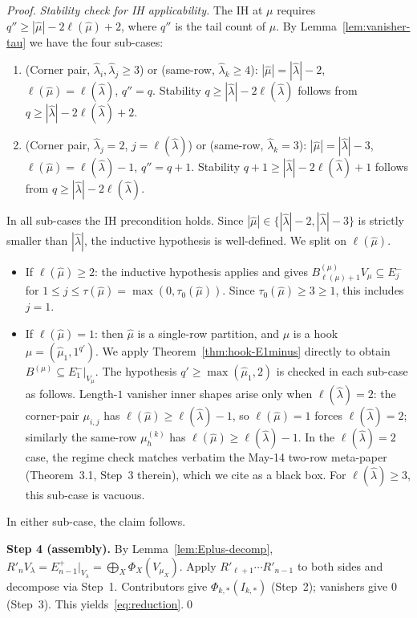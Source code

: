 \documentclass[11pt]{article}
\theoremstyle{definition}
\newcommand{\Vlam}{V_\lambda}
\newcommand{\hatl}{\widehat\lambda}
\newcommand{\hatm}{\widehat\mu}
\newcommand{\Rp}{{R'}}
\newcommand{\elh}{\ell(\hatl)}
\begin{document}
\begin{proof}
\smallskip\emph{Stability check for IH applicability.}  The IH at
$\mu$ requires $q'' \ge |\hatm| - 2\ell(\hatm) + 2$, where $q''$ is the
tail count of $\mu$.  By Lemma~\ref{lem:vanisher-tau} we have the four
sub-cases:
\begin{enumerate}[label=(\arabic*),topsep=0.2em,itemsep=0.1em]
\item (Corner pair, $\hatl_i, \hatl_j \ge 3$) or (same-row, $\hatl_k
   \ge 4$): $|\hatm| = |\hatl| - 2$, $\ell(\hatm) = \elh$, $q'' = q$.
   Stability $q \ge |\hatl| - 2\elh$ follows from $q \ge |\hatl| -
   2\elh + 2$.
\item (Corner pair, $\hatl_j = 2$, $j = \elh$) or (same-row,
   $\hatl_k = 3$): $|\hatm| = |\hatl| - 3$, $\ell(\hatm) = \elh - 1$,
   $q'' = q + 1$.  Stability $q + 1 \ge |\hatl| - 2\elh + 1$ follows
   from $q \ge |\hatl| - 2\elh$.
\end{enumerate}
In all sub-cases the IH precondition holds.  Since $|\hatm| \in
\{|\hatl| - 2, |\hatl| - 3\}$ is strictly smaller than $|\hatl|$, the
inductive hypothesis is well-defined.  We split on $\ell(\hatm)$.
\begin{itemize}[topsep=0.2em,itemsep=0.1em]
\item If $\ell(\hatm) \ge 2$: the inductive hypothesis applies and
   gives $B^{(\mu)}_{\ell(\mu)+1} V_\mu \subseteq E_j^-$ for
   $1 \le j \le \tau(\hatm) = \max(0, \tau_0(\hatm))$.  Since
   $\tau_0(\hatm) \ge 3 \ge 1$, this includes $j = 1$.
\item If $\ell(\hatm) = 1$: then $\hatm$ is a single-row partition,
   and $\mu$ is a hook $\mu = (\hatm_1, 1^{q'})$.  We apply
   Theorem~\ref{thm:hook-E1minus} directly to obtain $B^{(\mu)}
   \subseteq E_1^-|_{V_\mu}$.  The hypothesis $q' \ge \max(\hatm_1, 2)$
   is checked in each sub-case as follows.  Length-$1$ vanisher inner
   shapes arise only when $\elh = 2$: the corner-pair $\mu_{i,j}$ has
   $\ell(\hatm) \ge \elh - 1$, so $\ell(\hatm) = 1$ forces $\elh = 2$;
   similarly the same-row $\mu_h^{(k)}$ has $\ell(\hatm) \ge \elh - 1$.
   In the $\elh = 2$ case, the regime check matches verbatim the
   May-14 two-row meta-paper (Theorem~3.1, Step~3 therein), which we
   cite as a black box.  For $\elh \ge 3$, this sub-case is vacuous.
\end{itemize}

In either sub-case, the claim follows.\smallskip

\medskip\textbf{Step 4 (assembly).}  By Lemma~\ref{lem:Eplus-decomp},
$\Rp_n \Vlam = E_{n-1}^+|_{\Vlam} = \bigoplus_X \Phi_X(V_{\mu_X})$.
Apply $\Rp_{\ell+1} \cdots \Rp_{n-1}$ to both sides and decompose via
Step~1.  Contributors give $\Phi_{k,*}(I_{k,*})$ (Step~2); vanishers
give $0$ (Step~3).  This yields~\eqref{eq:reduction}.\qed
\end{proof}
\end{document}
